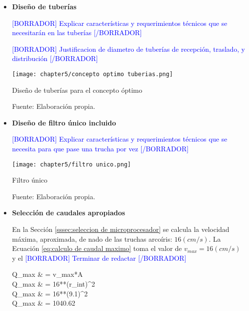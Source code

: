 \begin{itemize}
	
	\item \textbf{Diseño de tuberías}
	
	\textcolor{blue}{[BORRADOR] Explicar características y requerimientos técnicos que se necesitarán en las tuberías [/BORRADOR]} 
	
	\textcolor{blue}{[BORRADOR] Justificacion de diametro de tuberías de recepción, traslado, y distribución [/BORRADOR]}
	
	\begin{myfigure}[H]
		\centering
		\texttt{[image: chapter5/concepto optimo tuberias.png]}
		\caption{Diseño de tuberías para el concepto óptimo}
		\begin{myflushleftportland}
			Fuente: Elaboración propia.
		\end{myflushleftportland}
		\label{fig:concepto optimo tuberias}
	\end{myfigure}
	
	\item \textbf{Diseño de filtro único incluido}
	
	\textcolor{blue}{[BORRADOR] Explicar características y requerimientos técnicos que se necesita para que pase una trucha por vez [/BORRADOR]} 
	
	\begin{myfigure}[H]
		\centering
		\texttt{[image: chapter5/filtro unico.png]}
		\caption{Filtro único}
		\begin{myflushleftportland}
			Fuente: Elaboración propia.
		\end{myflushleftportland}
		\label{fig:filtro unico}
	\end{myfigure}
	
	\item \textbf{Selección de caudales apropiados} 
	
	En la Sección \ref{sssec:seleccion de microprocesador} se calcula la velocidad máxima, aproximada, de nado de las truchas arcoíris: $16 (cm/s)$. La Ecuación \ref{eq:calculo de caudal maximo} toma el valor de \textit{$v_{max}=16 (cm/s)$}  y el \textcolor{blue}{[BORRADOR] Terminar de redactar [/BORRADOR]} 
	
	\begin{myequation}\label{eq:calculo de caudal maximo}
		\begin{split}
			Q_{max} & = v_{max}*A \\
			Q_{max} & = 16**(r_{int})^2 \\
			Q_{max} & = 16**(9.1)^2 \\
			Q_{max} & = 1040.62 
		\end{split}		
	\end{myequation}


\end{itemize}
